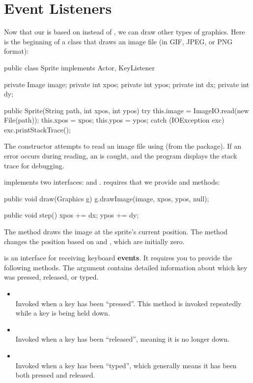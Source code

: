 \section{Event Listeners}

Now that our  is based on  instead of , we can draw other types of graphics.
Here is the beginning of a class that draws an image file (in GIF, JPEG, or PNG format):

\begin{code}
public class Sprite implements Actor, KeyListener {
    private Image image;
    private int xpos;
    private int ypos;
    private int dx;
    private int dy;

    public Sprite(String path, int xpos, int ypos) {
        try {
            this.image = ImageIO.read(new File(path));
            this.xpos = xpos;
            this.ypos = ypos;
        } catch (IOException exc) {
            exc.printStackTrace();
        }
    }
}
\end{code}

The constructor attempts to read an image file using  (from the  package).
If an error occurs during reading, an  is caught, and the program displays the stack trace for debugging.

 implements two interfaces:  and .
 requires that we provide  and  methods:

\begin{code}
public void draw(Graphics g) {
    g.drawImage(image, xpos, ypos, null);
}

public void step() {
    xpos += dx;
    ypos += dy;
}
\end{code}

The  method draws the image at the sprite's current position.
The  method changes the position based on  and , which are initially zero.


 is an interface for receiving keyboard {\bf events}.
It requires you to provide the following methods.
The  argument contains detailed information about which key was pressed, released, or typed.

\begin{itemize}

\item {}
\\ Invoked when a key has been ``pressed''.
This method is invoked repeatedly while a key is being held down.

\item {}
\\ Invoked when a key has been ``released'', meaning it is no longer down.

\item {}
\\ Invoked when a key has been ``typed'', which generally means it has been both pressed and released.

\end{itemize}

